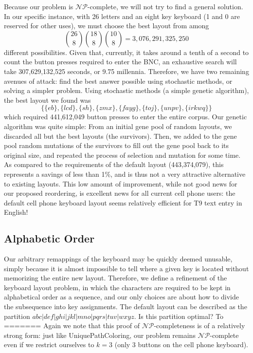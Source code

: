 \documentclass[runningheads]{llncs}
\newcommand{\NP}{\ensuremath{\mathcal{NP}}}
\begin{document}
\begin{prob}[{\sc
MinimumKeystrokes}]
Because our problem is \NP-complete, we will not try to find a general solution.  In our specific instance, with 26 letters and an eight key keyboard (1 and 0 are reserved for other uses),  we must choose the best layout from among $$\binom{26}{8} \binom{18}{8} \binom{10}{8} = 3,076,291,325,250$$ different possibilities.  Given that, currently, it takes around a tenth of a second to count the button presses required to enter the BNC, an exhaustive search will take 307,629,132,525 seconds, or 9.75 millennia.  Therefore, we have two remaining avenues of attack: find the best answer possible using stochastic methods, or solving a simpler problem.  Using stochastic methods (a simple genetic algorithm), the best layout we found was 
$$\{\{eb\}, \{lcd\}, \{sh\}, \{zmx\}, \{fayg\}, \{toj\}, \{unpv\}, \{irkwq\}\}$$
which required 441,612,049 button presses to enter the entire corpus.  Our genetic algorithm was quite simple: From an initial gene pool of random layouts, we discarded all but the best layouts (the survivors).  Then, we added to the gene pool random mutations of the survivors to fill out the gene pool back to its original size, and repeated the process of selection and mutation for some time.  As compared to the requirements of the default layout (443,374,079), this represents a savings of less than 1\%, and is thus not a very attractive alternative to existing layouts.  This low amount of improvement, while not good news for our proposed reordering, is excellent news for all current cell phone users: the default cell phone keyboard layout seems relatively efficient for T9 text entry in English!

\subsection{Alphabetic Order}

Our arbitrary remappings of the keyboard may be quickly deemed unusable, simply
because it is almost impossible to tell where a given key is located without
memorizing the entire new layout.  Therefore, we define a refinement of the
keyboard layout problem, in which the characters are required to be kept in
alphabetical order as a sequence, and our only choices are about how to divide
the subsequence into key assignments.  The default layout can be described as
the partition
$abc|def|ghi|jkl|mno|pqrs|tuv|wxyz$.  Is this partition optimal?  To
=======
Again we note that this proof of \NP-completeness is of a relatively strong form: just like {\sc UniquePathColoring}, our problem remains \NP-complete even if we restrict ourselves to $k=3$ (only 3 buttons on the cell phone keyboard).


\end{prob}
\end{document}

